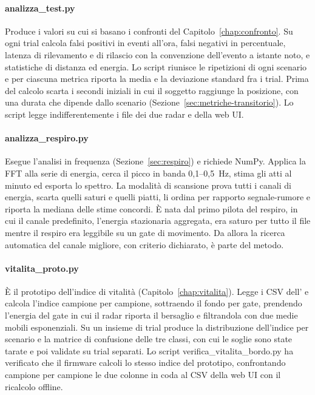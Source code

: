\paragraph{analizza\_test.py}

Produce i valori su cui si basano i confronti del Capitolo~\ref{chap:confronto}. Su ogni trial calcola falsi positivi in eventi all'ora, falsi negativi in percentuale, latenza di rilevamento e di rilascio con la convenzione dell'evento a istante noto, e statistiche di distanza ed energia. Lo script riunisce le ripetizioni di ogni scenario e per ciascuna metrica riporta la media e la deviazione standard fra i trial. Prima del calcolo scarta i secondi iniziali in cui il soggetto raggiunge la posizione, con una durata che dipende dallo scenario (Sezione~\ref{sec:metriche-transitorio}). Lo script legge indifferentemente i file dei due radar e della web UI.

\paragraph{analizza\_respiro.py}

Esegue l'analisi in frequenza (Sezione~\ref{sec:respiro}) e richiede NumPy. Applica la FFT alla serie di energia, cerca il picco in banda 0,1--0,5~Hz, stima gli atti al minuto ed esporta lo spettro. La modalità di scansione prova tutti i canali di energia, scarta quelli saturi e quelli piatti, li ordina per rapporto segnale-rumore e riporta la mediana delle stime concordi. È nata dal primo pilota del respiro, in cui il canale predefinito, l'energia stazionaria aggregata, era saturo per tutto il file mentre il respiro era leggibile su un gate di movimento. Da allora la ricerca automatica del canale migliore, con criterio dichiarato, è parte del metodo.

\paragraph{vitalita\_proto.py}

È il prototipo dell'indice di vitalità (Capitolo~\ref{chap:vitalita}). Legge i CSV dell'\ldb{} e calcola l'indice campione per campione, sottraendo il fondo per gate, prendendo l'energia del gate in cui il radar riporta il bersaglio e filtrandola con due medie mobili esponenziali. Su un insieme di trial produce la distribuzione dell'indice per scenario e la matrice di confusione delle tre classi, con cui le soglie sono state tarate e poi validate su trial separati. Lo script verifica\_vitalita\_bordo.py ha verificato che il firmware calcoli lo stesso indice del prototipo, confrontando campione per campione le due colonne in coda al CSV della web UI con il ricalcolo offline.


